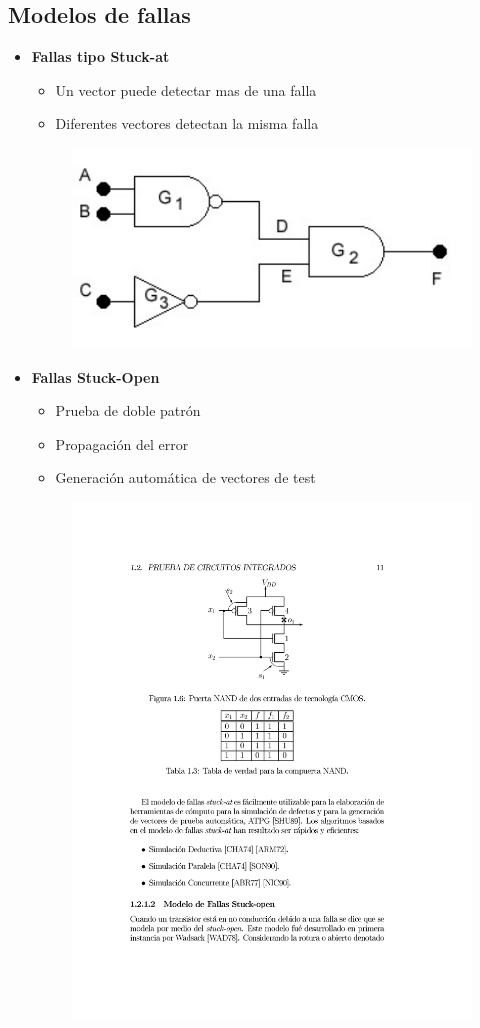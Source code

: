 \documentclass[
paper=128mm:96mm, %
fontsize=11pt, %
pagesize, %
parskip=half-, %
]{scrartcl} %
\theoremstyle{mythmstyle} %
\begin{document}
\clearpage


\subsection{Modelos de fallas}

\begin{itemize}
\item \textbf{Fallas tipo Stuck-at}
  \begin{itemize}
  \item Un vector puede detectar mas de una falla
  \item Diferentes vectores detectan la misma falla
  \end{itemize}

  \begin{figure}[h]
    \centering\includegraphics[width=0.5\linewidth]{combina01}
  \end{figure}
  \clearpage

\item \textbf{Fallas Stuck-Open}
  \begin{itemize}
  \item Prueba de doble patrón
  \item Propagación del error
  \item Generación automática de vectores de test
  \end{itemize}

  \begin{figure}[h]
    \centering\includegraphics[width=0.5\linewidth]{stuckOpen}
  \end{figure}


\end{itemize}
\end{document}
